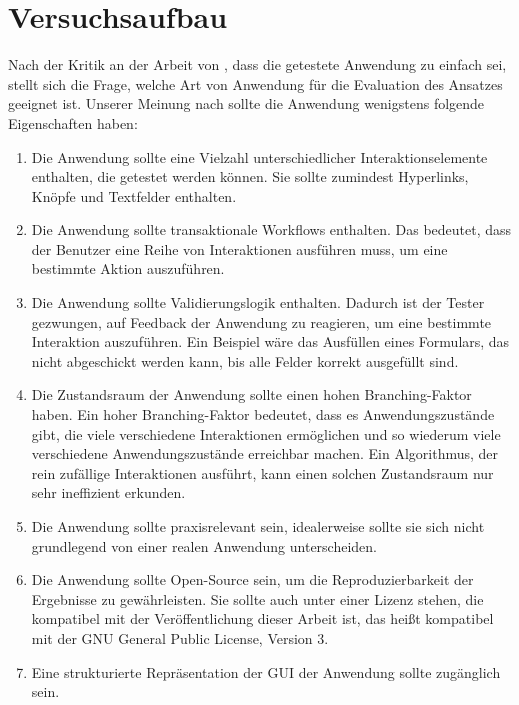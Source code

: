 \chapter{Versuchsaufbau}
\label{ch:ExperimentalSetup}

Nach der Kritik an der Arbeit von , dass die getestete Anwendung zu einfach sei, stellt sich die Frage, welche Art von Anwendung für die Evaluation des Ansatzes geeignet ist.
Unserer Meinung nach sollte die Anwendung wenigstens folgende Eigenschaften haben:

\begin{enumerate}
    \item
        Die Anwendung sollte eine Vielzahl unterschiedlicher Interaktionselemente enthalten, die getestet werden können. 
        Sie sollte zumindest Hyperlinks, Knöpfe und Textfelder enthalten.
    \item
        Die Anwendung sollte transaktionale Workflows enthalten.
        Das bedeutet, dass der Benutzer eine Reihe von Interaktionen ausführen muss, um eine bestimmte Aktion auszuführen.
    \item
        Die Anwendung sollte Validierungslogik enthalten. Dadurch ist der Tester gezwungen, auf Feedback der Anwendung zu reagieren, um eine bestimmte Interaktion auszuführen.
        Ein Beispiel wäre das Ausfüllen eines Formulars, das nicht abgeschickt werden kann, bis alle Felder korrekt ausgefüllt sind.
    \item
        Die Zustandsraum der Anwendung sollte einen hohen Branching-Faktor haben.
        Ein hoher Branching-Faktor bedeutet, dass es Anwendungszustände gibt, die viele verschiedene Interaktionen ermöglichen und so wiederum viele verschiedene Anwendungszustände erreichbar machen.
        Ein Algorithmus, der rein zufällige Interaktionen ausführt, kann einen solchen Zustandsraum nur sehr ineffizient erkunden.
    \item
        Die Anwendung sollte praxisrelevant sein, idealerweise sollte sie sich nicht grundlegend von einer realen Anwendung unterscheiden.
    \item 
        Die Anwendung sollte Open-Source sein, um die Reproduzierbarkeit der Ergebnisse zu gewährleisten.
        Sie sollte auch unter einer Lizenz stehen, die kompatibel mit der Veröffentlichung dieser Arbeit ist, das heißt kompatibel mit der GNU General Public License, Version 3.
    \item Eine strukturierte Repräsentation der GUI der Anwendung sollte zugänglich sein.
\end{enumerate}

